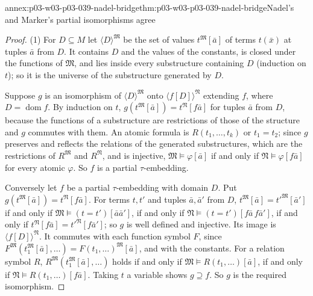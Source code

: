\begin{annexitem}{annex:p03-w03-p03-039-nadel-bridge}{thm:p03-w03-p03-039-nadel-bridge}{Nadel's and Marker's partial isomorphisms agree}
\begin{proof}
(1) For \(D\subseteq M\) let \(\langle D\rangle^{\mathfrak M}\) be the set of
values \(t^{\mathfrak M}[\bar a]\) of terms \(t(\bar x)\) at tuples \(\bar a\)
from \(D\). It contains \(D\) and the values of the constants, is closed
under the functions of \(\mathfrak M\), and lies inside every substructure
containing \(D\) (induction on \(t\)); so it is the universe of the
substructure generated by \(D\).

Suppose \(g\) is an isomorphism of \(\langle D\rangle^{\mathfrak M}\) onto
\(\langle f[D]\rangle^{\mathfrak N}\) extending \(f\), where
\(D=\operatorname{dom}f\). By induction on \(t\),
\(g(t^{\mathfrak M}[\bar a])=t^{\mathfrak N}[f\bar a]\) for tuples \(\bar a\)
from \(D\), because the functions of a substructure are restrictions of those
of the structure and \(g\) commutes with them. An atomic formula is
\(R(t_1,\dots,t_k)\) or \(t_1=t_2\); since \(g\) preserves and reflects the
relations of the generated substructures, which are the restrictions of
\(R^{\mathfrak M}\) and \(R^{\mathfrak N}\), and is injective,
\(\mathfrak M\models\varphi[\bar a]\) if and only if
\(\mathfrak N\models\varphi[f\bar a]\) for every atomic \(\varphi\). So \(f\)
is a partial \(\tau\)-embedding.

Conversely let \(f\) be a partial \(\tau\)-embedding with domain \(D\). Put
\(g(t^{\mathfrak M}[\bar a])=t^{\mathfrak N}[f\bar a]\). For terms \(t,t'\)
and tuples \(\bar a,\bar a'\) from \(D\),
\(t^{\mathfrak M}[\bar a]=t'^{\mathfrak M}[\bar a']\) if and only if
\(\mathfrak M\models(t=t')[\bar a\bar a']\), if and only if
\(\mathfrak N\models(t=t')[f\bar a\,f\bar a']\), if and only if
\(t^{\mathfrak N}[f\bar a]=t'^{\mathfrak N}[f\bar a']\); so \(g\) is well
defined and injective. Its image is \(\langle f[D]\rangle^{\mathfrak N}\). It
commutes with each function symbol \(F\), since
\(F^{\mathfrak M}(t_1^{\mathfrak M}[\bar a],\dots)=F(t_1,\dots)^{\mathfrak M}[\bar a]\),
and with the constants. For a relation symbol \(R\),
\(R^{\mathfrak M}(t_1^{\mathfrak M}[\bar a],\dots)\) holds if and only if
\(\mathfrak M\models R(t_1,\dots)[\bar a]\), if and only if
\(\mathfrak N\models R(t_1,\dots)[f\bar a]\). Taking \(t\) a variable shows
\(g\supseteq f\). So \(g\) is the required isomorphism.


\end{proof}
\end{annexitem}
